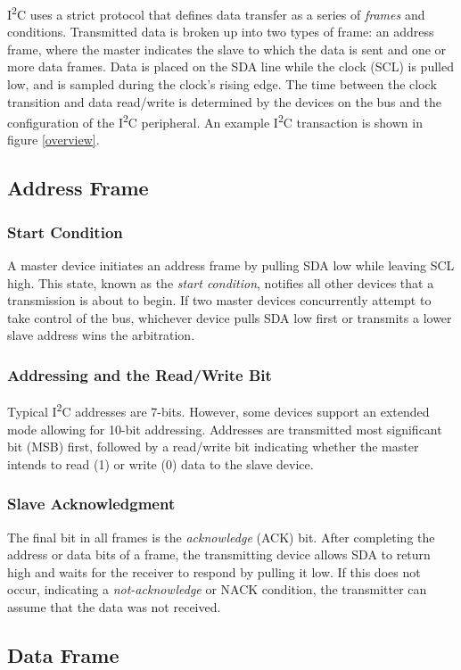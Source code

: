 \documentclass[11pt,fleqn]{book} %
\begin{document}
    I\textsuperscript{2}C uses a strict protocol that defines data transfer as a series of \textit{frames} and conditions.     
    Transmitted data is broken up into two types of frame: an address frame, where the master indicates the slave to which the data is sent and one or more data frames. Data is placed on the SDA line while the clock (SCL) is pulled low, and is sampled during the clock's rising edge. The time between the clock transition and data read/write is determined by the devices on the bus and the configuration of the I\textsuperscript{2}C peripheral. An example I\textsuperscript{2}C transaction is shown in figure \ref{overview}. 
    
    \subsection{Address Frame}
        \subsubsection{Start Condition}
        A master device initiates an address frame by pulling SDA low while leaving SCL high. This state, known as the \textit{start condition}, notifies all other devices that a transmission is about to begin. If two master devices concurrently attempt to take control of the bus, whichever device pulls SDA low first or transmits a lower slave address  wins the arbitration. 
        \subsubsection{Addressing and the Read/Write Bit}
        Typical I\textsuperscript{2}C addresses are 7-bits. However, some devices support an extended mode allowing for 10-bit addressing. Addresses are transmitted most significant bit (MSB) first, followed by a read/write bit indicating whether the master intends to read (1) or write (0) data to the slave device. 
        \subsubsection{Slave Acknowledgment}
        The final bit in all frames is the \textit{acknowledge} (ACK) bit. After completing the address or data bits of a frame, the transmitting device allows SDA to return high and waits for the receiver to respond by pulling it low. If this does not occur, indicating a \textit{not-acknowledge} or NACK condition, the transmitter can assume that the data was not received. 
    \subsection{Data Frame}
\end{document}
